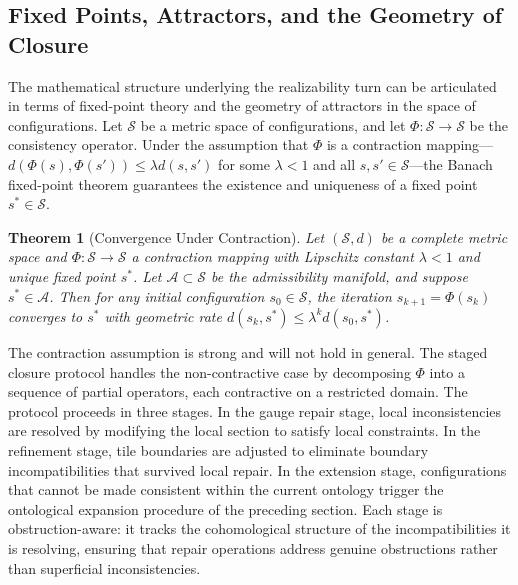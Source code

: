 \documentclass[12pt, oneside]{article}
\newtheorem{theorem}{Theorem}
\begin{document}
\subsection{Fixed Points, Attractors, and the Geometry of Closure}

The mathematical structure underlying the realizability turn can be articulated in terms of fixed-point theory and the geometry of attractors in the space of configurations. Let $\mathcal{S}$ be a metric space of configurations, and let $\Phi : \mathcal{S} \to \mathcal{S}$ be the consistency operator. Under the assumption that $\Phi$ is a contraction mapping---$d(\Phi(s), \Phi(s')) \leq \lambda d(s, s')$ for some $\lambda < 1$ and all $s, s' \in \mathcal{S}$---the Banach fixed-point theorem guarantees the existence and uniqueness of a fixed point $s^* \in \mathcal{S}$.

\begin{theorem}[Convergence Under Contraction]
Let $(\mathcal{S}, d)$ be a complete metric space and $\Phi : \mathcal{S} \to \mathcal{S}$ a contraction mapping with Lipschitz constant $\lambda < 1$ and unique fixed point $s^*$. Let $\mathcal{A} \subset \mathcal{S}$ be the admissibility manifold, and suppose $s^* \in \mathcal{A}$. Then for any initial configuration $s_0 \in \mathcal{S}$, the iteration $s_{k+1} = \Phi(s_k)$ converges to $s^*$ with geometric rate $d(s_k, s^*) \leq \lambda^k d(s_0, s^*)$.
\end{theorem}

The contraction assumption is strong and will not hold in general. The staged closure protocol handles the non-contractive case by decomposing $\Phi$ into a sequence of partial operators, each contractive on a restricted domain. The protocol proceeds in three stages. In the gauge repair stage, local inconsistencies are resolved by modifying the local section to satisfy local constraints. In the refinement stage, tile boundaries are adjusted to eliminate boundary incompatibilities that survived local repair. In the extension stage, configurations that cannot be made consistent within the current ontology trigger the ontological expansion procedure of the preceding section. Each stage is obstruction-aware: it tracks the cohomological structure of the incompatibilities it is resolving, ensuring that repair operations address genuine obstructions rather than superficial inconsistencies.
\end{document}
